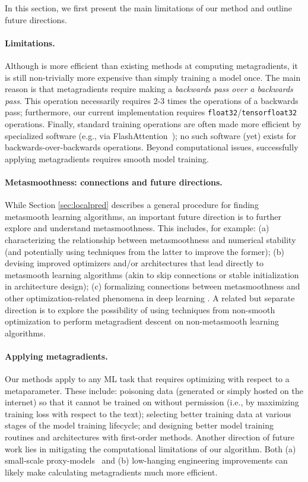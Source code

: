 
In this section, we first present the main limitations of our method and
outline future directions.

\paragraph{Limitations.} Although \replay{} is more efficient than existing
methods at computing metagradients, it is still non-trivially more expensive
than simply training a model once. The main reason is that metagradients require
making a \emph{backwards pass over a backwards pass}. This operation necessarily
requires 2-3 times the operations of a backwards pass; furthermore, our current
implementation requires \texttt{float32}/\texttt{tensorfloat32} operations.
Finally, standard training operations are often made more efficient by
specialized software (e.g., via FlashAttention~\citep{dao2022flashattention});
no such software (yet) exists for backwards-over-backwards operations. Beyond
computational issues, successfully applying metagradients requires smooth model
training. 

\paragraph{Metasmoothness: connections and future directions.}
While Section \ref{sec:localpred} describes a general procedure for finding 
metasmooth learning algorithms, an important future direction is 
to further explore and understand metasmoothness.
This includes, for example: 
(a) characterizing the relationship between metasmoothness 
and numerical stability (and potentially using techniques from the latter to
improve the former); 
(b) devising improved optimizers and/or architectures that lead directly 
to metasmooth learning algorithms (akin to skip connections or 
stable initialization in architecture design);
(c) formalizing connections between metasmoothness and other 
optimization-related phenomena in deep learning 
\citep{leclerc2020two,cohen2022gradient}. 
A related but separate direction is to explore the possibility of using 
techniques from non-smooth optimization \citep{clarke1990optimization} 
to perform metagradient descent on non-metasmooth learning algorithms.


\paragraph{Applying metagradients.}
Our methods apply to any ML task that requires
optimizing with respect to a metaparameter. 
These include: poisoning data
(generated or simply hosted on the internet) so that it cannot be trained on
without permission (i.e., by maximizing training loss with respect to the text);
selecting better training data at various stages of the model training
lifecycle; and designing better model training routines and architectures with
first-order methods. Another direction of future work lies in mitigating the
computational limitations of our algorithm. Both (a) small-scale
proxy-models~\citep{hoffmann2022training,engstrom2024dsdm} and (b) low-hanging
engineering improvements can likely make calculating metagradients much more
efficient.




